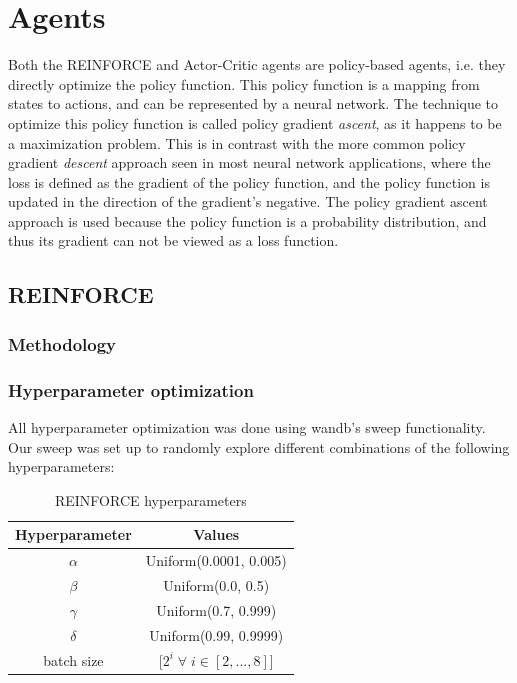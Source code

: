 \documentclass{article}
\begin{document}
\section{Agents}
\label{Agents}

Both the REINFORCE and Actor-Critic agents are policy-based agents, i.e. they directly optimize the policy function.
This policy function is a mapping from states to actions, and can be represented by a neural network.
The technique to optimize this policy function is called policy gradient \textit{ascent}, as it happens to be a maximization problem.
This is in contrast with the more common policy gradient \textit{descent} approach seen in most neural network applications, where the loss is defined as the gradient of the policy function, and the policy function is updated in the direction of the gradient's negative.
The policy gradient ascent approach is used because the policy function is a probability distribution, and thus its gradient can not be viewed as a loss function.

\subsection{REINFORCE}
\label{A-REINFORCE}


\subsubsection{Methodology}
\label{R-Method}

\subsubsection{Hyperparameter optimization}
\label{R-HPO}

All hyperparameter optimization was done using wandb's sweep functionality.
Our sweep was set up to randomly explore different combinations of the following hyperparameters:

\begin{table}[H]
    \centering
    \begin{tabular}{|c|c|}
        \hline
        \textbf{Hyperparameter} & \textbf{Values} \\
        \hline
        $\alpha$ & Uniform(0.0001, 0.005) \\
        $\beta$ & Uniform(0.0, 0.5) \\
        $\gamma$ & Uniform(0.7, 0.999) \\
        $\delta$ & Uniform(0.99, 0.9999) \\
        batch size & [$2^i \; \forall \; i \in [2, ..., 8]$] \\
        \hline
    \end{tabular}
    \caption{REINFORCE hyperparameters}
    \label{tab:my_label}
\end{table}
\end{document}
